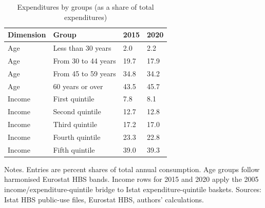 \begin{table}[H]
\small
\setlength{\tabcolsep}{4pt}
\renewcommand{\arraystretch}{0.95}

\caption{\label{tab:it-hbs-all-products}Expenditures by groups (as a share of total expenditures)}
\centering
\begin{tabular}[t]{llll}
\toprule
Dimension & Group & 2015 & 2020\\
\midrule
Age & Less than 30 years & 2.0 & 2.2\\
Age & From 30 to 44 years & 19.7 & 17.9\\
Age & From 45 to 59 years & 34.8 & 34.2\\
Age & 60 years or over & 43.5 & 45.7\\
Income & First quintile & 7.8 & 8.1\\
Income & Second quintile & 12.7 & 12.8\\
Income & Third quintile & 17.2 & 17.0\\
Income & Fourth quintile & 23.3 & 22.8\\
Income & Fifth quintile & 39.0 & 39.3\\
\bottomrule
\end{tabular}
\vspace{-0.6em}
\begin{flushleft}
\footnotesize{Notes. Entries are percent shares of total annual consumption. Age groups follow harmonised Eurostat HBS bands. Income rows for 2015 and 2020 apply the 2005 income/expenditure-quintile bridge to Istat expenditure-quintile baskets. Sources: Istat HBS public-use files, Eurostat HBS, authors' calculations.}
\end{flushleft}
\end{table}
